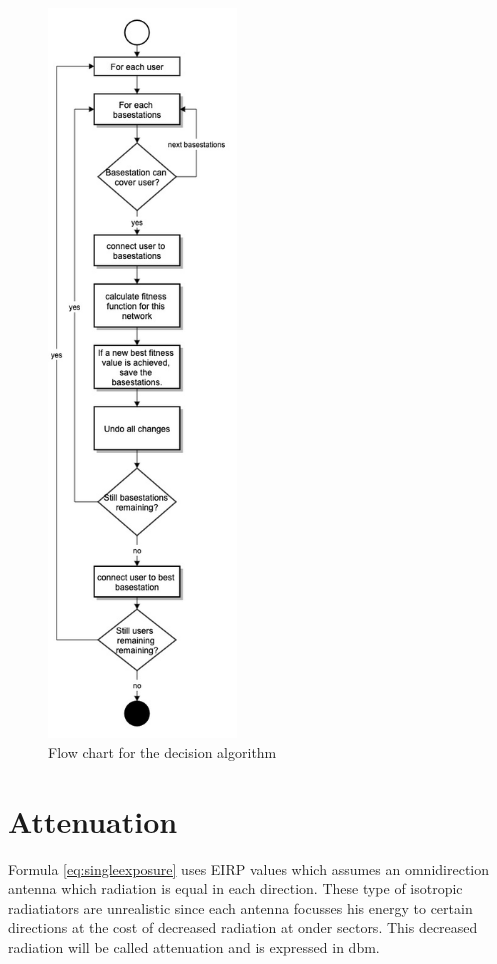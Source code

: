 \begin{figure}
  \includegraphics[width=5cm]{../images/decisionAlgoFlowChart.jpg}
  \caption{Flow chart for the decision algorithm}
  \label{fig:decisionAlgoFlowChart}
\end{figure}


\section{Attenuation}
\label{subsec:attenuation}
Formula \ref{eq:singleexposure} uses EIRP values which assumes an omnidirection antenna which radiation is equal in each direction. These type of isotropic radiatiators are unrealistic since each antenna focusses his 
energy to certain directions at the cost of decreased radiation at onder sectors. This decreased radiation will be called attenuation and is expressed in dbm.

